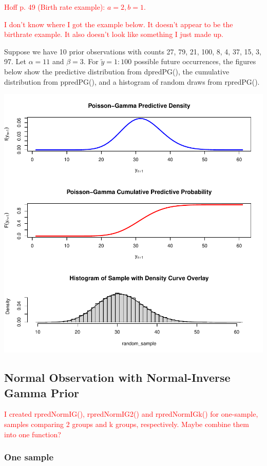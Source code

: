 \documentclass[12pt, a4paper]{article}
\begin{document}
\textcolor{red}{  Hoff p. 49 (Birth rate example):  $a = 2, b = 1$. }

\textcolor{red}{I don't know where I got the example below.  It doesn't appear to be the birthrate example.  It also doesn't look like something I just made up.}

Suppose we have 10 prior observations with counts 27, 79, 21, 100, 8, 4, 37, 15, 3, 97.  Let $\alpha = 11$ and $\beta = 3$.  For $\tilde{y} = 1:100$ possible future occurrences, the figures below show the predictive distribution from dpredPG(), the cumulative distribution from ppredPG(), and a histogram of random draws from rpredPG().

\includegraphics{Thesis_v1-005}

\clearpage

  \subsection{Normal Observation with Normal-Inverse Gamma Prior}

    \textcolor{red}{I created rpredNormIG(), rpredNormIG2() and rpredNormIGk() for one-sample, samples comparing 2 groups and k groups, respectively.  Maybe combine them into one function?}
    \subsubsection{One sample}
\end{document}
